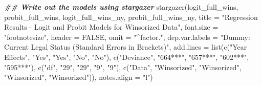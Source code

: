 \documentclass[a4paper,nobind]{templates/ociamthesis}
\newenvironment{Shaded}{\begin{snugshade}}{\end{snugshade}}
\newcommand{\AttributeTok}[1]{\textcolor[rgb]{0.77,0.63,0.00}{#1}}
\newcommand{\ConstantTok}[1]{\textcolor[rgb]{0.00,0.00,0.00}{#1}}
\newcommand{\DocumentationTok}[1]{\textcolor[rgb]{0.56,0.35,0.01}{\textbf{\textit{#1}}}}
\newcommand{\FunctionTok}[1]{\textcolor[rgb]{0.00,0.00,0.00}{#1}}
\newcommand{\NormalTok}[1]{#1}
\newcommand{\StringTok}[1]{\textcolor[rgb]{0.31,0.60,0.02}{#1}}
\renewenvironment{Shaded}
{
  \vspace{10pt}%
  \begin{snugshade}%
}{%
  \end{snugshade}%
  \vspace{8pt}%
}
\begin{document}
\begin{Shaded}
\begin{Highlighting}[]
\DocumentationTok{\#\# Write out the models using stargazer}
\FunctionTok{stargazer}\NormalTok{(logit\_full\_wins, probit\_full\_wins, logit\_full\_wins\_ny, probit\_full\_wins\_ny, }\AttributeTok{title =} \StringTok{"Regression Results {-} Logit and Probit Models for Winsorized Data"}\NormalTok{, }\AttributeTok{font.size =} \StringTok{"footnotesize"}\NormalTok{, }\AttributeTok{header =} \ConstantTok{FALSE}\NormalTok{, }\AttributeTok{omit =} \StringTok{"\^{}factor."}\NormalTok{, }\AttributeTok{dep.var.labels =} \StringTok{"Dummy: Current Legal Status (Standard Errors in Brackets)"}\NormalTok{, }\AttributeTok{add.lines =} \FunctionTok{list}\NormalTok{(}\FunctionTok{c}\NormalTok{(}\StringTok{"Year Effects"}\NormalTok{, }\StringTok{"Yes"}\NormalTok{, }\StringTok{"Yes"}\NormalTok{, }\StringTok{"No"}\NormalTok{, }\StringTok{"No"}\NormalTok{), }\FunctionTok{c}\NormalTok{(}\StringTok{"Deviance"}\NormalTok{, }\StringTok{"664***"}\NormalTok{, }\StringTok{"657***"}\NormalTok{, }\StringTok{"602***"}\NormalTok{, }\StringTok{"595***"}\NormalTok{), }\FunctionTok{c}\NormalTok{(}\StringTok{"df"}\NormalTok{, }\StringTok{"29"}\NormalTok{, }\StringTok{"29"}\NormalTok{, }\StringTok{"9"}\NormalTok{, }\StringTok{"9"}\NormalTok{), }\FunctionTok{c}\NormalTok{(}\StringTok{"Data"}\NormalTok{, }\StringTok{"Winsorized"}\NormalTok{, }\StringTok{"Winsorized"}\NormalTok{, }\StringTok{"Winsorized"}\NormalTok{, }\StringTok{"Winsorized"}\NormalTok{)), }\AttributeTok{notes.align =} \StringTok{"l"}\NormalTok{)}
\end{Highlighting}
\end{Shaded}
\end{document}
